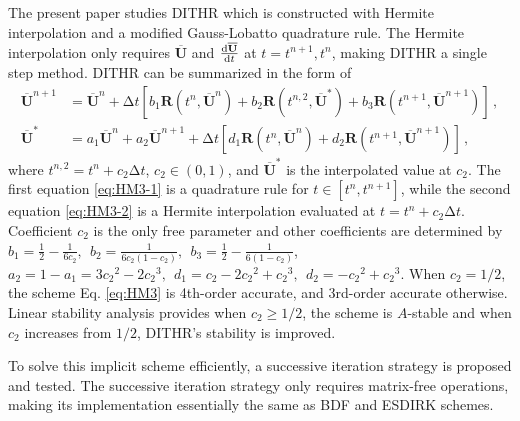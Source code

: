 \documentclass[10pt]{article}
\newcommand{\uu}{\overline{\mathbf{U}}}
\newcommand{\R}{\mathbf{R}}
\newcommand{\inc}{\mathrm\Delta}
\begin{document}
The present paper 
studies DITHR which is constructed with 
Hermite interpolation and a modified Gauss-Lobatto quadrature rule.
The Hermite interpolation only requires 
$\uu$ and $\dv{\uu}{t}$ at $t=t^{n+1}, t^{n}$, 
making DITHR a single step method.
DITHR can be summarized in the form of 
\begin{subequations}
  \label{eq:HM3}
  \begin{align}
    \uu^{n+1} & = \uu^{n} +
    \inc t
    \left[
      b_1\R(t^n, \uu^n) +
      b_2\R(t^{n,2}, \uu^*) +
      b_3\R(t^{n+1}, \uu^{n+1})
    \right]   \label{eq:HM3-1}\,, \\
    \uu^{*}   & =
    a_1\uu^{n} +
    a_2\uu^{n+1} +
    \inc t
    \left[
      d_1\R(t^{n}, \uu^n) +
      d_2\R(t^{n+1}, \uu^{n+1})
      \right] \label{eq:HM3-2}\,,
  \end{align}
\end{subequations}
where $t^{n,2}=t^n+c_2\inc t$, $c_2\in(0,1)$,
and $\uu^*$ is the interpolated value at $c_2$.
The first equation \eqref{eq:HM3-1} is
a quadrature rule for $t\in[t^n,t^{n+1}]$,
while the second equation \eqref{eq:HM3-2} is a Hermite interpolation
evaluated at $t=t^n + c_2\inc t$.
Coefficient $c_2$ is the only free parameter and other coefficients are 
determined by
\(
b_1  = \frac{1}{2} - \frac{1}{6{c_2}},\ \
b_2  = \frac{1}{6{c_2}(1-{c_2})},\ \
b_3  = \frac{1}{2} - \frac{1}{6(1-{c_2})}
\),
\(
a_2 = 1 - a_1 = 3{c_2}^2 - 2 {c_2}^3,\ \
d_1  = {c_2} - 2 {c_2}^2 + {c_2}^3   ,\ \
d_2  = - {c_2}^2 + {c_2}^3
\). When $c_2=1/2$, the scheme Eq. \eqref{eq:HM3}
is 4th-order accurate, and 3rd-order accurate otherwise.
Linear stability analysis provides when $c_2\geq1/2$, the
scheme is $A$-stable and when $c_2$ increases from $1/2$, 
DITHR's stability is improved.

To solve this implicit scheme efficiently,
a successive iteration strategy is proposed and tested.
The successive iteration strategy only requires 
matrix-free operations, making its implementation
essentially the same as BDF and ESDIRK schemes.
\end{document}
